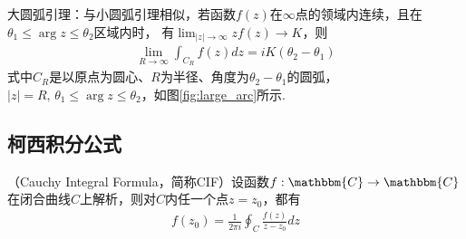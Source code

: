         \begin{lemma}
            \label{lem:large_arc_lemma}
            大圆弧引理：与小圆弧引理相似，若函数$f(z)$在$\infty$点的领域内连续，且在$\theta_1 \leq \arg{z} \leq \theta_2$区域内时，
            有$\lim_{|z| \to \infty}zf(z) \to K$，则
            \begin{align*}
                \lim_{R \to \infty}\int_{C_R}f(z)dz = iK(\theta_2 - \theta_1)
            \end{align*}
            式中$C_R$是以原点为圆心、$R$为半径、角度为$\theta_2 - \theta_1$的圆弧，
            $|z| = R,\,\theta_1 \leq \arg{z} \leq \theta_2$，如图\ref{fig:large_arc}所示.
        \end{lemma}

    \subsection{柯西积分公式}
        \begin{theorem}[Cauchy积分公式]\label{the:cauchy_integral_formula}
            （Cauchy Integral Formula，简称CIF）设函数$f:\mathbbm{C} \to \mathbbm{C}$
            在闭合曲线$C$上解析，则对$C$内任一个点$z = z_0$，都有
            \begin{align*}
                \label{eq:cauchy_integral_formula}
                f(z_0) = \frac{1}{2 \pi i}\oint_{C}\frac{f(z)}{z - z_0}dz
            \end{align*}
        \end{theorem}

